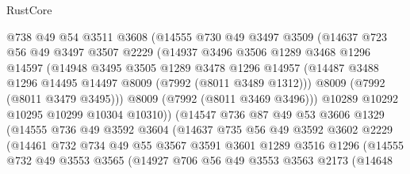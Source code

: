 \begin{lexlean}{RustCore}
\begin{coremodule}
                  @738
                  @49
                  @54
                  @3511
                  @3608
                  (@14555
                    @730
                    @49
                    @3497
                    @3509
                    (@14637
                      @723
                      @56
                      @49
                      @3497
                      @3507
                      @2229
                      (@14937
                        @3496
                        @3506
                        @1289
                        @3468
                        @1296
                        @14597
                        (@14948
                          @3495
                          @3505
                          @1289
                          @3478
                          @1296
                          @14957
                          (@14487 @3488 @1296 @14495 @14497 @8009 (@7992 (@8011 @3489 @1312)))
                          @8009
                          (@7992 (@8011 @3479 @3495)))
                        @8009
                        (@7992 (@8011 @3469 @3496)))
                      @10289
                      @10292
                      @10295
                      @10299
                      @10304
                      @10310))
                  (@14547
                    @736
                    @87
                    @49
                    @53
                    @3606
                    @1329
                    (@14555
                      @736
                      @49
                      @3592
                      @3604
                      (@14637
                        @735
                        @56
                        @49
                        @3592
                        @3602
                        @2229
                        (@14461
                          @732
                          @734
                          @49
                          @55
                          @3567
                          @3591
                          @3601
                          @1289
                          @3516
                          @1296
                          (@14555
                            @732
                            @49
                            @3553
                            @3565
                            (@14927
                              @706
                              @56
                              @49
                              @3553
                              @3563
                              @2173
                              (@14648

\end{coremodule}
\end{lexlean}
